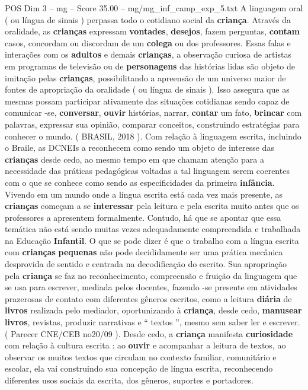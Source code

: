 \begin{textsample}{POS Dim 3 – mg – Score 35.00 – mg/mg\_inf\_camp\_exp\_5.txt}
A linguagem oral ( ou língua de sinais ) perpassa todo o cotidiano social da \textbf{criança}.
Através da oralidade, as \textbf{crianças} expressam \textbf{vontades}, \textbf{desejos}, fazem perguntas, \textbf{contam} casos, concordam ou discordam de um \textbf{colega} ou dos professores.
Essas falas e interações com os \textbf{adultos} e demais \textbf{crianças}, a observação curiosa de artistas em programas de televisão ou de \textbf{personagens} das histórias lidas são objeto de imitação pelas \textbf{crianças}, possibilitando a apreensão de um universo maior de fontes de apropriação da oralidade ( ou língua de sinais ).
Isso assegura que as mesmas possam participar ativamente das situações cotidianas sendo capaz de comunicar -se, \textbf{conversar}, \textbf{ouvir} histórias, narrar, \textbf{contar} um fato, \textbf{brincar} com palavras, expressar sua opinião, comparar conceitos, construindo estratégias para conhecer o mundo. ( BRASIL, 2018 ).
Com relação à linguagem escrita, incluindo o Braile, as DCNEIs a reconhecem como sendo um objeto de interesse das \textbf{crianças} desde cedo, ao mesmo tempo em que chamam atenção para a necessidade das práticas pedagógicas voltadas a tal linguagem serem coerentes com o que se conhece como sendo as especificidades da primeira \textbf{infância}.
Vivendo em um mundo onde a língua escrita está cada vez mais presente, as \textbf{crianças} começam a se \textbf{interessar} pela leitura e pela escrita muito antes que os professores a apresentem formalmente.
Contudo, há que se apontar que essa temática não está sendo muitas vezes adequadamente compreendida e trabalhada na Educação \textbf{Infantil}.
O que se pode dizer é que o trabalho com a língua escrita com \textbf{crianças} \textbf{pequenas} não pode decididamente ser uma prática mecânica desprovida de sentido e centrada na decodificação do escrito.
Sua apropriação pela \textbf{criança} se faz no reconhecimento, compreensão e fruição da linguagem que se usa para escrever, mediada pelos docentes, fazendo -se presente em atividades prazerosas de contato com diferentes gêneros escritos, como a leitura \textbf{diária} de \textbf{livros} realizada pelo mediador, oportunizando à \textbf{criança}, desde cedo, \textbf{manusear} \textbf{livros}, revistas, produzir narrativas e “ textos ”, mesmo sem saber ler e escrever. ( Parecer CNE/CEB no20/09 ).
Desde cedo, a \textbf{criança} manifesta \textbf{curiosidade} com relação à cultura escrita : ao \textbf{ouvir} e acompanhar a leitura de textos, ao observar os muitos textos que circulam no contexto familiar, comunitário e escolar, ela vai construindo sua concepção de língua escrita, reconhecendo diferentes usos sociais da escrita, dos gêneros, suportes e portadores.

\end{textsample}
